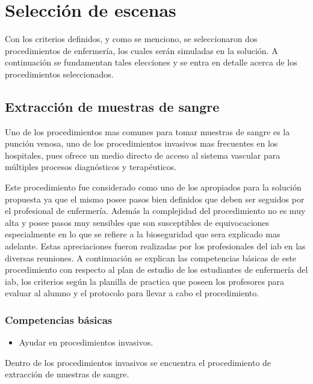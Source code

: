 \section{Selección de escenas}
\label{sec:seleccion_escenas}
Con los criterios definidos, y como se menciono, se seleccionaron dos procedimientos de enfermería, los cuales serán simuladas en la solución. A continuación se fundamentan tales elecciones y se entra en 
detalle acerca de los procedimientos seleccionados.

\subsection{Extracción de muestras de sangre}

Uno de los procedimientos mas comunes para tomar muestras de sangre es la punción venosa, uno de los 
procedimientos invasivos mas frecuentes en los hospitales, pues ofrece un medio directo de acceso al 
sistema vascular para múltiples procesos diagnósticos y terapéuticos.

Este procedimiento fue considerado como uno de los apropiados para la solución propuesta ya que el mismo
posee pasos bien definidos que deben ser seguidos por el profesional de enfermería. Además la complejidad
del procedimiento no es muy alta y posee pasos muy sensibles que son susceptibles de equivocaciones especialmente en lo que se refiere a la bioseguridad que sera explicado mas adelante. Estas apreciaciones
fueron realizadas por los profesionales del \Gls{iab} en las diversas reuniones. A continuación se
explican las competencias básicas de este procedimiento con respecto al plan de estudio de los estudiantes
de enfermería del \Gls{iab}, los criterios según la planilla de practica que poseen los profesores para evaluar al alumno y el protocolo para llevar a cabo el procedimiento.

\subsubsection{Competencias básicas}
\begin{itemize}
\item Ayudar en procedimientos invasivos.
\end{itemize}

Dentro de los procedimientos invasivos se encuentra el procedimiento de extracción de muestras de sangre.

